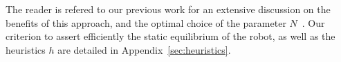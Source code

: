 The reader is refered to our previous work for an extensive discussion on the benefits of this approach, and the optimal choice 
of the parameter $N$~\citep{Tonneau2014}. Our criterion to assert efficiently the static equilibrium of the robot, as well as the heuristics $h$ are detailed in Appendix~\ref{sec:heuristics}.


